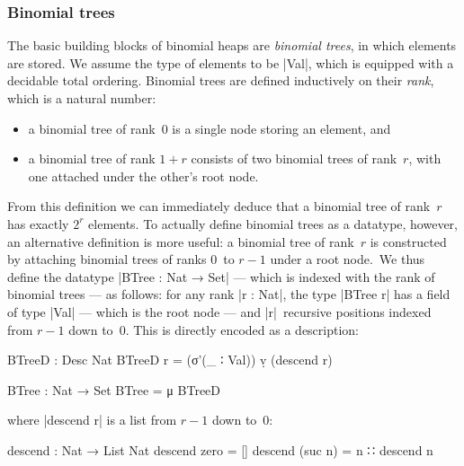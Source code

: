 \subsubsection{Binomial trees}
The basic building blocks of binomial heaps are \emph{binomial trees}, in which elements are stored.
We assume the type of elements to be |Val|, which is equipped with a decidable total ordering.
Binomial trees are defined inductively on their \emph{rank}, which is a natural number:
\begin{itemize}
\item a binomial tree of rank~$0$ is a single node storing an element, and
\item a binomial tree of rank $1+r$ consists of two binomial trees of rank~$r$, with one attached under the other's root node.
\end{itemize}
From this definition we can immediately deduce that a binomial tree of rank~$r$ has exactly $2^r$ elements.
To actually define binomial trees as a datatype, however, an alternative definition is more useful: a binomial tree of rank~$r$ is constructed by attaching binomial trees of ranks $0$~to $r-1$ under a root node.\
We thus define the datatype |BTree : Nat → Set| --- which is indexed with the rank of binomial trees --- as follows: for any rank |r : Nat|, the type |BTree r| has a field of type |Val| --- which is the root node --- and |r|~recursive positions indexed from $r-1$ down to~$0$.
This is directly encoded as a description:
\begin{code}
BTreeD : Desc Nat
BTreeD r = (σ'(_ ∶ Val)) ṿ (descend r)

BTree : Nat → Set
BTree = μ BTreeD
\end{code}
where |descend r| is a list from $r-1$ down to~$0$:
\begin{code}
descend : Nat → List Nat
descend zero     =  []
descend (suc n)  =  n ∷ descend n
\end{code}


